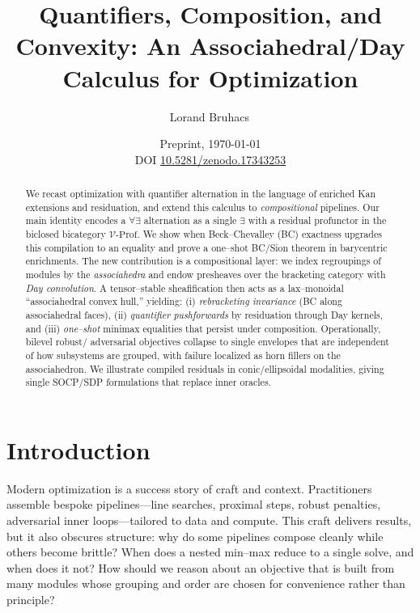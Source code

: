 \documentclass[11pt]{article}
\title{Quantifiers, Composition, and Convexity: An Associahedral/Day Calculus for Optimization}
\author{Lorand Bruhacs\,\orcidlink{0009-0004-6751-0715}}
\date{\normalsize Preprint, \today \\ DOI \href{https://doi.org/10.5281/zenodo.17343253}{10.5281/zenodo.17343253}}
\numberwithin{equation}{section}
\theoremstyle{upright}
\newcommand{\V}{\mathcal{V}}
\newcommand{\Prof}{\mathrm{Prof}}
\begin{document}
\maketitle

\begin{abstract}
We recast optimization with quantifier alternation in the language of enriched Kan extensions and residuation, and extend this calculus to \emph{compositional} pipelines. Our main identity encodes a $\forall\exists$ alternation as a single $\exists$ with a residual profunctor in the biclosed bicategory $\V\text{-}\Prof$. We show when Beck--Chevalley (BC) exactness upgrades this compilation to an equality and prove a one–shot BC/Sion theorem in barycentric enrichments. The new contribution is a compositional layer: we index regroupings of modules by the \emph{associahedra} and endow presheaves over the bracketing category with \emph{Day convolution}. A tensor–stable sheafification then acts as a lax–monoidal “associahedral convex hull,” yielding: (i) \emph{rebracketing invariance} (BC along associahedral faces), (ii) \emph{quantifier pushforwards} by residuation through Day kernels, and (iii) \emph{one–shot} minimax equalities that persist under composition. Operationally, bilevel robust/ adversarial objectives collapse to single envelopes that are independent of how subsystems are grouped, with failure localized as horn fillers on the associahedron. We illustrate compiled residuals in conic/ellipsoidal modalities, giving single SOCP/SDP formulations that replace inner oracles.
\end{abstract}

\tableofcontents

\section{Introduction}
\label{sec:intro}

Modern optimization is a success story of craft and context. Practitioners assemble bespoke pipelines—line searches, proximal steps, robust penalties, adversarial inner loops—tailored to data and compute. This craft delivers results, but it also obscures structure: why do some pipelines compose cleanly while others become brittle? When does a nested min--max reduce to a single solve, and when does it not? How should we reason about an objective that is built from many modules whose grouping and order are chosen for convenience rather than principle?
\end{document}
